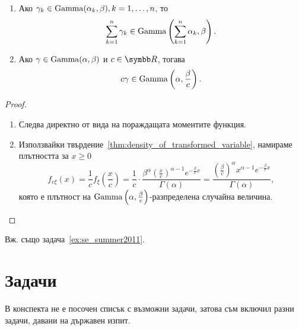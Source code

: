 \documentclass[numbers=endperiod, bibliography=totocnumbered]{scrartcl}
\begin{document}
\begin{proposition}\label{thm:gamma_linear_combination_is_gamma}
  \mbox{}
  \begin{enumerate}
    \item Ако \( \gamma_k \in \operatorname{Gamma}(\alpha_k, \beta), k = 1, \ldots, n \), то
    \begin{equation*}
      \sum_{k=1}^n \gamma_k \in \operatorname{Gamma}\left( \sum_{k=1}^n \alpha_k, \beta \right).
    \end{equation*}

    \item Ако \( \gamma \in \operatorname{Gamma}(\alpha, \beta) \) и \( c \in \R \), тогава
    \begin{equation*}
      c \gamma \in \operatorname{Gamma}\left(\alpha, \frac \beta c \right).
    \end{equation*}
  \end{enumerate}
\end{proposition}
\begin{proof}
  \mbox{}
  \begin{enumerate}
    \item Следва директно от вида на пораждащата моментите функция.
    \item Използвайки твърдение~\ref{thm:density_of_transformed_variable}, намираме плътността за \( x \geq 0 \)
    \begin{equation*}
      f_{c\xi}(x)
      =
      \frac 1 c f_\xi\left(\frac x c \right)
      =
      \frac 1 c \cdot \frac {\beta^\alpha {\left(\frac x c \right)}^{\alpha-1} e^{-\frac \beta c x}} {\Gamma(\alpha)}
      =
      \frac {{\left(\frac \beta c \right)}^\alpha x^{\alpha-1} e^{-\frac \beta c x}} {\Gamma(\alpha)},
    \end{equation*}
    която е плътност на \( \operatorname{Gamma}\left(\alpha, \frac \beta c \right) \)-разпределена случайна величина.
  \end{enumerate}
\end{proof}

Вж. също задача~\ref{ex:se_summer2011}.

\section{Задачи}

В конспекта не е посочен списък с възможни задачи, затова съм включил разни задачи, давани на държавен изпит.
\end{document}
